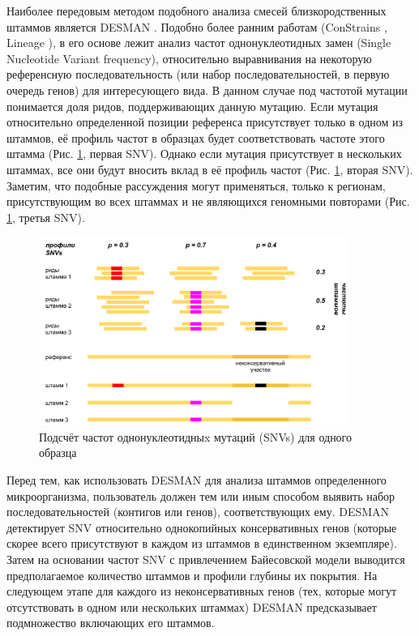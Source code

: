 \documentclass{spbau-diploma}
\begin{document}
Наиболее передовым методом подобного анализа смесей близкородственных штаммов является DESMAN \cite{DESMAN}.
Подобно более ранним работам (ConStrains \cite{Constrains}, Lineage \cite{Lineage}), в его основе лежит анализ частот однонуклеотидных замен (Single Nucleotide Variant frequency), относительно выравнивания на некоторую референсную последовательность (или набор последовательностей, в первую очередь генов) для интересующего вида. 
В данном случае под частотой мутации понимается доля ридов, поддерживающих данную мутацию. 
Если мутация относительно определенной позиции референса присутствует только в одном из штаммов, её профиль частот в образцах будет соответствовать частоте этого штамма (Рис. \ref{snv_profile}, первая SNV). 
Однако если мутация присутствует в нескольких штаммах, все они будут вносить вклад в её профиль частот (Рис. \ref{snv_profile}, вторая SNV). 
Заметим, что подобные рассуждения могут применяться, только к регионам, присутствующим во всех штаммах и не являющихся геномными повторами (Рис. \ref{snv_profile}, третья SNV). 


\begin{figure}[t]
\centering
\includegraphics[width=0.9\textwidth]{pics/snv_profiles.png}
\caption{Подсчёт частот однонуклеотидныx мутаций (SNVs) для одного образца}
\label{snv_profile}
\end{figure}

 
Перед тем, как использовать DESMAN для анализа штаммов определенного микроорганизма, пользователь должен тем или иным способом выявить набор последовательностей (контигов или генов), соответствующих ему.
DESMAN детектирует SNV относительно однокопийных консервативных генов (которые скорее всего присутствуют в каждом из штаммов в единственном экземпляре). 
Затем на основании частот SNV с привлечением Байесовской модели выводится предполагаемое количество штаммов и профили глубины их покрытия. 
На следующем этапе для каждого из неконсервативных генов (тех, которые могут отсутствовать в одном или нескольких штаммах) DESMAN предсказывает подмножество включающих его штаммов.
\end{document}
